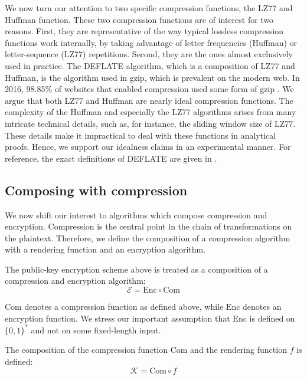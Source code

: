 \documentclass[conference, letterpaper, 10pt]{IEEEtran}
\begin{document}
We now turn our attention to two specific compression functions, the
LZ77 and Huffman function. These two compression functions are of
interest for two reasons. First, they are representative of the way
typical lossless compression functions work internally, by taking
advantage of letter frequencies (Huffman) or letter-sequence (LZ77)
repetitions. Second, they are the ones almost exclusively used in
practice. The DEFLATE algorithm, which is a composition of LZ77 and
Huffman, is the algorithm used in gzip, which is prevalent on the
modern web. In 2016, 98.85\% of websites that enabled compression used
some form of gzip \cite{c19}. We argue that both LZ77 and Huffman are nearly
ideal compression functions. The complexity of the Huffman and
especially the LZ77 algorithms arises from many intricate technical
details, such as, for instance, the sliding window size of LZ77. These
details make it impractical to deal with these functions in analytical
proofs. Hence, we support our idealness claims in an experimental
manner. For reference, the exact definitions of DEFLATE are given in
\cite{c12}.

\subsection{Composing with compression}\label{subsec:comcompose}

We now shift our interest to algorithms which compose compression and
encryption. Compression is the central point in the chain of transformations on
the plaintext. Therefore, we define the composition of a compression algorithm
with a rendering function and an encryption algorithm.

The public-key encryption scheme above is treated as a composition of a
compression and encryption algorithm:
\begin{equation*}
    \mathcal{E} = \textrm{Enc} \circ \textrm{Com}
\end{equation*}

$\textrm{Com}$ denotes a compression function as defined above, while
$\textrm{Enc}$ denotes an
encryption function. We stress our important assumption that $\textrm{Enc}$ is defined
on $\{0, 1\}^*$ and not on some fixed-length input.

The composition of the compression function $\textrm{Com}$ and the rendering function $f$
is defined:
\begin{equation*}
    \mathcal{K} = \textrm{Com} \circ f
\end{equation*}
\end{document}
